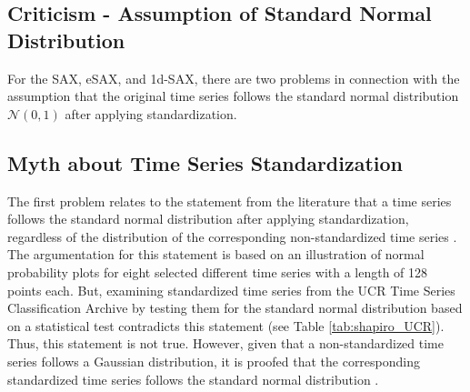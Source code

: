 \subsection{Criticism - Assumption of Standard Normal Distribution}
For the \ac{SAX}, \ac{eSAX}, and \ac{1d-SAX}, there are two problems in connection with the assumption that the original time series follows the standard normal distribution $\mathcal{N}(0,1)$ after applying standardization.
\subsection*{Myth about Time Series Standardization}
The first problem relates to the statement from the literature that a time series follows the standard normal distribution after applying standardization, regardless of the distribution of the corresponding non-standardized time series \cite{SAX_Lin}. The argumentation for this statement is based on an illustration of normal probability plots for eight selected different time series with a length of 128 points each. But, examining standardized time series from the UCR Time Series Classification Archive \cite{UCR_Archive} by testing them for the standard normal distribution based on a statistical test contradicts this statement (see Table \ref{tab:shapiro_UCR}). Thus, this statement is not true. However, given that a non-standardized time series follows a Gaussian distribution, it is proofed that the corresponding standardized time series follows the standard normal distribution \cite{Standardization}.
